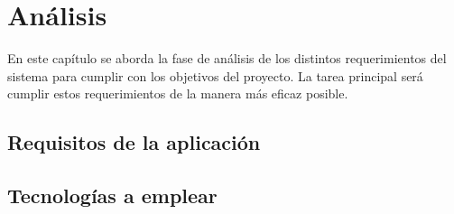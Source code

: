 \chapter{Análisis}
En este capítulo se aborda la fase de análisis de los distintos requerimientos  del sistema para cumplir con los objetivos del proyecto. 
La tarea principal será cumplir estos requerimientos de la manera más eficaz posible.
\section{Requisitos de la aplicación}
\section{Tecnologías a emplear}